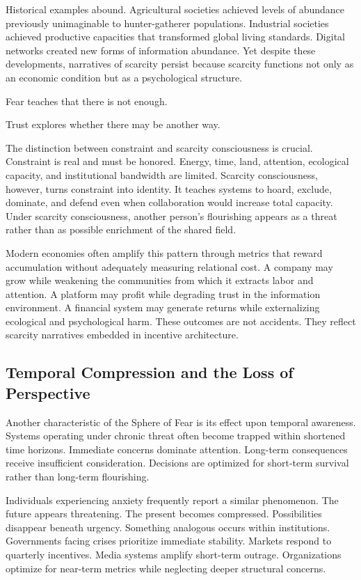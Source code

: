 \documentclass[12pt]{article}
\begin{document}
Historical examples abound. Agricultural societies achieved levels of abundance previously unimaginable to hunter-gatherer populations. Industrial societies achieved productive capacities that transformed global living standards. Digital networks created new forms of information abundance. Yet despite these developments, narratives of scarcity persist because scarcity functions not only as an economic condition but as a psychological structure.

Fear teaches that there is not enough.

Trust explores whether there may be another way.

The distinction between constraint and scarcity consciousness is crucial. Constraint is real and must be honored. Energy, time, land, attention, ecological capacity, and institutional bandwidth are limited. Scarcity consciousness, however, turns constraint into identity. It teaches systems to hoard, exclude, dominate, and defend even when collaboration would increase total capacity. Under scarcity consciousness, another person's flourishing appears as a threat rather than as possible enrichment of the shared field.

Modern economies often amplify this pattern through metrics that reward accumulation without adequately measuring relational cost. A company may grow while weakening the communities from which it extracts labor and attention. A platform may profit while degrading trust in the information environment. A financial system may generate returns while externalizing ecological and psychological harm. These outcomes are not accidents. They reflect scarcity narratives embedded in incentive architecture.

\subsection{Temporal Compression and the Loss of Perspective}

Another characteristic of the Sphere of Fear is its effect upon temporal awareness. Systems operating under chronic threat often become trapped within shortened time horizons. Immediate concerns dominate attention. Long-term consequences receive insufficient consideration. Decisions are optimized for short-term survival rather than long-term flourishing.

Individuals experiencing anxiety frequently report a similar phenomenon. The future appears threatening. The present becomes compressed. Possibilities disappear beneath urgency. Something analogous occurs within institutions. Governments facing crises prioritize immediate stability. Markets respond to quarterly incentives. Media systems amplify short-term outrage. Organizations optimize for near-term metrics while neglecting deeper structural concerns.
\end{document}
